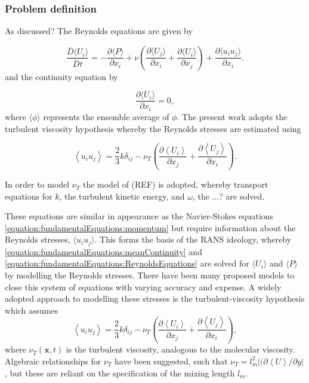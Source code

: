 \documentclass[12pt,oneside,a4paper]{article}
\newcommand{\pdev}[2]{\frac{\partial {#1}}{\partial {#2}}}
\begin{document}
\subsubsection{Problem definition}
As discussed? The Reynolds equations are given by

\begin{equation}
\frac{\overline{D} \langle U_i \rangle }{ \overline{D} t}
=
-\pdev{\langle P \rangle}{x_i}
+
\nu
	\left(
	\pdev{\langle U_j \rangle}{x_i}
	+
	\pdev{\langle U_i \rangle}{x_j} 
	\right)
+
\pdev{\langle u_i u_j\rangle}{x_i}.
\end{equation}
and the continuity equation by

\begin{equation}
\pdev{\langle U_i\rangle}{x_i}=0,
\end{equation}
where $\langle \phi \rangle$ represents the ensemble average of $\phi$. The present work adopts the turbulent viscosity hypothesis whereby the Reynolds stresses are estimated using

\begin{equation}
\left< u_i u_j \right> = \frac{2}{3}k \delta_{ij} - \nu_T \left( 
	\pdev{\left< U_i \right>}{x_j} + \pdev{\left< U_j \right>}{x_i}	\right).
\end{equation}

In order to model $\nu_T$ the model of (REF) is adopted, whereby transport equations for $k$, the turbulent kinetic energy, and $\omega$, the ...? are solved. 


These equations are similar in appearance as the Navier-Stokes equations \eqref{equation:fundamentalEquations:momentum} but require information about the Reynolds stresses, $\langle u_i u_j \rangle$. This forms the basis of the RANS ideology, whereby \eqref{equation:fundamentalEquations:meanContinuity} and \eqref{equation:fundamentalEquations:ReynoldsEquations} are solved for $\langle U_i \rangle$ and $\langle P \rangle$ by modelling the Reynolds stresses. There have been many proposed models to close this system of equations with varying accuracy and expense. A widely adopted approach to modelling these stresses is the turbulent-viscosity hypothesis which assumes
\begin{equation}
\left< u_i u_j \right> = \frac{2}{3}k \delta_{ij} - \nu_T \left( 
	\pdev{\left< U_i \right>}{x_j} + \pdev{\left< U_j \right>}{x_i}	\right),
\end{equation}
where $\nu_T(\boldsymbol{x},t)$ is the turbulent viscosity, analogous to the molecular viscosity. Algebraic relationships for $\nu_T$ have been suggested, such that $\nu_T=l_m^2 \left| (\partial \left<U\right> / \partial y   \right|$, but these are reliant on the specification of the mixing length $l_m$. 
\end{document}
